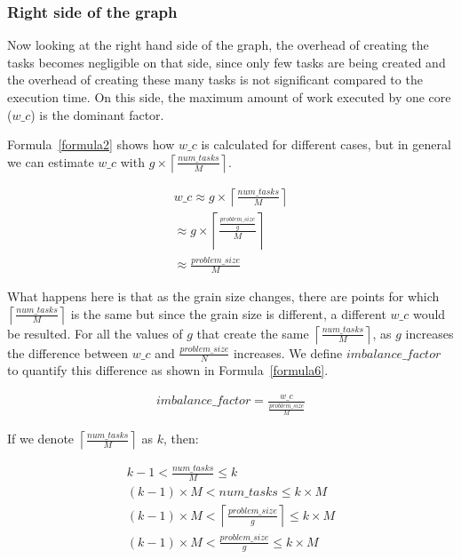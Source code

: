 \subsubsection{Right side of the graph}
Now looking at the right hand side of the graph, the overhead of creating the tasks becomes negligible on that side, since only few tasks are being created and the overhead of creating these many tasks is not significant compared to the execution time. On this side, the maximum amount of work executed by one core ($w\_c$) is the dominant factor.

Formula~\ref{formula2} shows how $w\_c$ is calculated for different cases, but in general we can estimate $w\_c$ with $g\times\left \lceil{\frac{num\_{tasks}}{M}}\right \rceil$. 

\begin{equation}\label{formula6}
\begin{aligned}
w\_c\approx{g\times\left \lceil{\frac{num\_{tasks}}{M}}\right \rceil}\\
\approx{g\times\left \lceil{\frac{\frac{problem\_{size}}{g}}{M}}\right \rceil}\\
\approx{\frac{problem\_{size}}{M}}
\end{aligned}
\end{equation}

What happens here is that as the grain size changes, there are points for which $\left \lceil{\frac{num\_{tasks}}{M}}\right \rceil$ is the same but since the grain size is different, a different $w\_c$ would be resulted. 
For all the values of $g$ that create the same $\left \lceil{\frac{num\_{tasks}}{M}}\right \rceil$, as $g$ increases the difference between $w\_c$ and $\frac{problem\_{size}}{N}$ increases. We define $imbalance\_{factor}$ to quantify this difference as shown in Formula~\ref{formula6}.

\begin{equation}\label{formula7}
\begin{aligned}
imbalance\_{factor}=\frac{w\_c}{\frac{problem\_{size}}{M}}
\end{aligned}
\end{equation}

If we denote $\left \lceil{\frac{num\_{tasks}}{M}}\right \rceil$ as $k$, then:


\begin{equation}\label{formula8}
\begin{aligned}
k-1<{\frac{num\_{tasks}}{M}}\leq{k}\\
(k-1)\times{M}<num\_{tasks}\leq{k}\times{M}\\
(k-1)\times{M}<\left \lceil{\frac{problem\_{size}}{g}}\right \rceil\leq{k}\times{M}\\
(k-1)\times{M}<\frac{problem\_{size}}{g}\leq{{k}\times{M}}\\
\end{aligned}
\end{equation}

